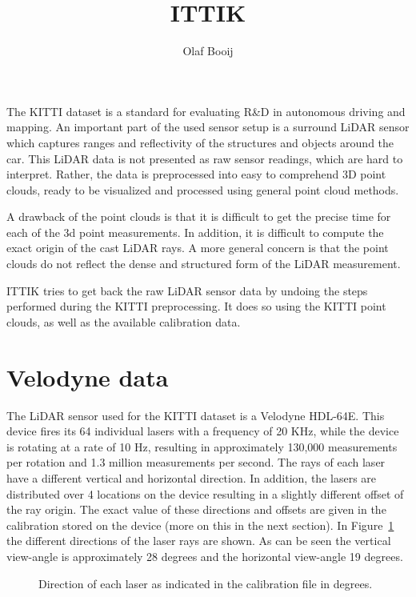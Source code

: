 \documentclass[english]{article}
\begin{document}
\title{ITTIK}
\author{Olaf Booij}

\maketitle

The KITTI dataset is a standard for evaluating R\&D in autonomous
driving and mapping. An important part of the used sensor setup is a
surround LiDAR sensor which captures ranges and reflectivity of the
structures and objects around the car.
This LiDAR data is not presented as raw sensor readings, which are hard
to interpret. Rather, the data is preprocessed into easy to comprehend
3D point clouds, ready to be visualized and processed using general
point cloud methods.

A drawback of the point clouds is that it is difficult to get the
precise time for each of the 3d point measurements. In addition, it is
difficult to compute the exact origin of the cast LiDAR rays. A more
general concern is that the point clouds do not reflect the dense and
structured form of the LiDAR measurement.

ITTIK tries to get back the raw LiDAR sensor data by undoing the steps
performed during the KITTI preprocessing. It does so using the KITTI
point clouds, as well as the available calibration data.

\section{Velodyne data}
The LiDAR sensor used for the KITTI dataset is a Velodyne HDL-64E. This
device fires its 64 individual lasers with a frequency of 20 KHz, while
the device is rotating at a rate of 10 Hz, resulting in approximately
130,000 measurements per rotation and 1.3 million measurements per
second. The rays of each laser have a different vertical and horizontal
direction. In addition, the lasers are distributed over 4 locations on
the device resulting in a slightly different offset of the ray origin.
The exact value of these directions and offsets are given in the
calibration stored on the device (more on this in the next section).
In Figure~\ref{fig:directions} the different directions of the laser
rays are shown. As can be seen the vertical view-angle is approximately
28 degrees and the horizontal view-angle 19 degrees.

\begin{figure}
    \centering
    \def\svgwidth{.8 \columnwidth}
    
    \caption{Direction of each laser as indicated in the calibration
    file in degrees.}
		\label{fig:directions}
\end{figure}
\end{document}
